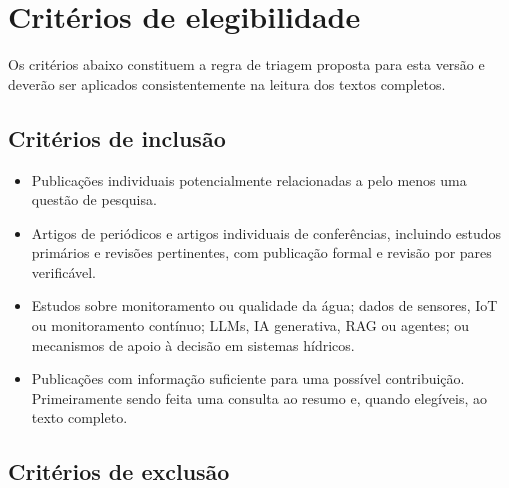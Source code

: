 \section{Critérios de elegibilidade}

Os critérios abaixo constituem a regra de triagem proposta para esta
versão e deverão ser aplicados consistentemente na leitura dos textos completos.

\subsection{Critérios de inclusão}

\begin{itemize}
    \item Publicações individuais potencialmente relacionadas a pelo menos
    uma questão de pesquisa.
    \item Artigos de periódicos e artigos individuais de conferências, incluindo
    estudos primários e revisões pertinentes, com publicação formal e revisão
    por pares verificável.
    \item Estudos sobre monitoramento ou qualidade da água; dados de
    sensores, IoT ou monitoramento contínuo; LLMs, IA generativa, RAG
    ou agentes; ou mecanismos de apoio à decisão em sistemas hídricos.
    \item Publicações com informação suficiente para uma possível
    contribuição. Primeiramente sendo feita uma consulta ao resumo e, quando elegíveis, ao texto
    completo.
\end{itemize}

\subsection{Critérios de exclusão}

